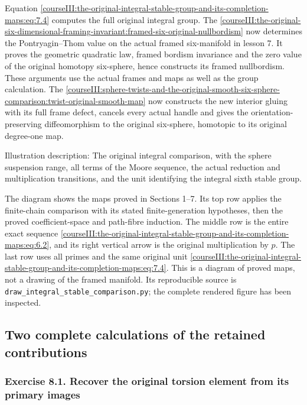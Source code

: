 Equation \eqref{courseIII:the-original-integral-stable-group-and-its-completion-maps:eq:7.4} computes the full original integral group. The \cref{courseIII:the-original-six-dimensional-framing-invariant:framed-six-original-nullbordism} now determines the Pontryagin--Thom value on the actual framed six-manifold in lesson 7. It proves the geometric quadratic law, framed bordism invariance and the zero value of the original homotopy six-sphere, hence constructs its framed nullbordism. These arguments use the actual frames and maps as well as the group calculation. The \cref{courseIII:sphere-twists-and-the-original-smooth-six-sphere-comparison:twist-original-smooth-map} now constructs the new interior gluing with its full frame defect, cancels every actual handle and gives the orientation-preserving diffeomorphism to the original six-sphere, homotopic to its original degree-one map.

Illustration description: The original integral comparison, with the sphere suspension range, all terms of the Moore sequence, the actual reduction and multiplication transitions, and the unit identifying the integral sixth stable group.

The diagram shows the maps proved in Sections 1--7. Its top row applies the finite-chain comparison with its stated finite-generation hypotheses, then the proved coefficient-space and path-fibre induction. The middle row is the entire exact sequence \eqref{courseIII:the-original-integral-stable-group-and-its-completion-maps:eq:6.2}, and its right vertical arrow is the original multiplication by \(p\). The last row uses all primes and the same original unit \eqref{courseIII:the-original-integral-stable-group-and-its-completion-maps:eq:7.4}. This is a diagram of proved maps, not a drawing of the framed manifold. Its reproducible source is \texttt{draw\_integral\_stable\_comparison.py}; the complete rendered figure has been inspected.

\subsection{Two complete calculations of the retained contributions}
\label{courseIII:the-original-integral-stable-group-and-its-completion-maps:integral-completion-exercises}

\label{courseIII:the-original-integral-stable-group-and-its-completion-maps:section-8}

\subsubsection{Exercise 8.1. Recover the original torsion element from its primary images}
\label{courseIII:the-original-integral-stable-group-and-its-completion-maps:exercise-8.1}

